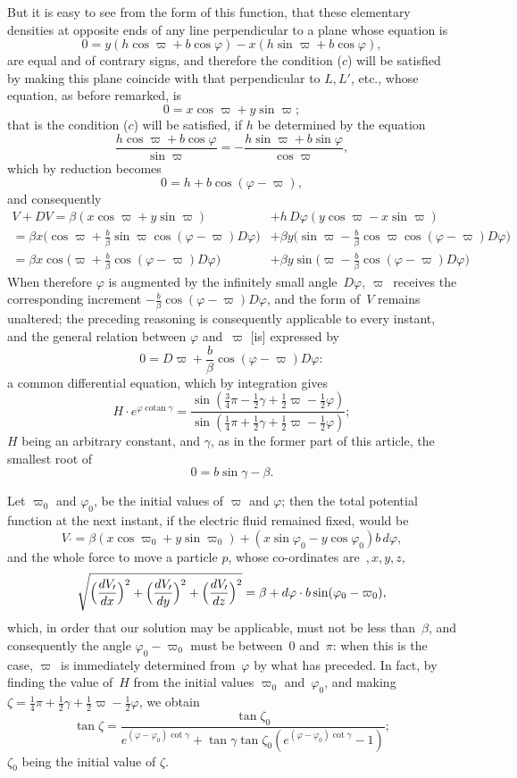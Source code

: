 \documentclass[11pt,notitlepage]{amsart}
\DeclareMathOperator{\cotan}{\textrm{cotan}}
\renewcommand{\phi}{\varphi}
\begin{document}
But it is easy to see from the form of this function, that these elementary
densities at opposite ends of any line
perpendicular to a plane whose equation is
\[
0 = y(h\cos\varpi+b\cos\phi)-x(h\sin\varpi+b\cos\phi),
\]
are equal and of contrary signs, and therefore the condition ($c$) will be 
satisfied by making this plane coincide with that perpendicular
to $L,L'$, etc.,
whose equation, as before remarked, is
\[
0=x\cos\varpi+y\sin\varpi;
\]
that is the condition ($c$) will be satisfied,
if $h$ be determined by the equation
\[
\frac{h\cos\varpi+b\cos\phi}{\sin\varpi}
=-\frac{h\sin\varpi+b\sin\phi}{\cos\varpi},
\]
which by reduction becomes
\[
0=h+b\cos(\phi-\varpi),
\]
and consequently
\[
\begin{aligned}
V+DV=\beta(x\cos\varpi+y\sin\varpi) &+ h\,D\phi(y\cos\varpi-x\sin\varpi)\\
=\beta x\bigl(\cos\varpi+\frac b\beta\sin\varpi\cos(\phi-\varpi)D\phi\bigr)
&+\beta y\bigl(\sin\varpi-\frac b\beta\cos\varpi\cos(\phi-\varpi)D\phi\bigr)\\
=\beta x\cos\bigl(\varpi+\frac b\beta\cos(\phi-\varpi)D\phi\bigr)
&+\beta y\sin\bigl(\varpi-\frac b\beta\cos(\phi-\varpi)D\phi\bigr)
\end{aligned}
\]
When therefore $\phi$ is augmented
by the infinitely small angle~$D\phi$, $\varpi$~receives
the corresponding increment $-\frac b\beta\cos(\phi-\varpi)D\phi$,
and the form of~$V$ remains
unaltered; the preceding reasoning is consequently applicable to every instant,
and the general relation between $\phi$ and~$\varpi$ [is] expressed by
\[
0=D\varpi+\frac b\beta\cos(\phi-\varpi)D\phi:
\]
a common differential equation, which by integration gives
\[
H\cdot e^{\phi\cotan\gamma}=
\frac{\sin(\frac34\pi-\frac12\gamma+\frac12\varpi-\frac12\phi)}
{\sin(\frac14\pi+\frac12\gamma+\frac12\varpi-\frac12\phi)};
\]
$H$ being an arbitrary constant, and $\gamma$,
as in the former part of this article,
the smallest root of
\[
0=b\sin\gamma-\beta.
\]

Let $\varpi_0$ and $\phi_0$, be the initial values of $\varpi$ and $\phi$;
then the total potential function at the next instant,
if the electric fluid remained fixed, would be
\[
V_\prime=
\beta(x\cos\varpi_0+y\sin\varpi_0)+(x\sin\phi_0-y\cos\phi_0)b\,d\phi,
\]
and the whole force to move a particle $p$, whose co-ordinates are~$,x,y,z$,
\[
\sqrt{
  \Bigl(\frac{dV_\prime}{dx}\Bigr)^2
  +\Bigl(\frac{dV_\prime}{dy}\Bigr)^2
  +\Bigl(\frac{dV_\prime}{dz}\Bigr)^2
}=\beta+d\phi\cdot b\sin(\phi_0-\varpi_0),
\]
which, in order that our solution may be applicable, must not be less 
than~$\beta$,
and consequently the angle $\phi_0-\varpi_0$
must be between~$0$ and~$\pi$: when this is
the case, $\varpi$~is immediately determined from~$\phi$
by what has preceded. In
fact, by finding the value of~$H$ from the initial
values $\varpi_0$ and~$\phi_0$, and
making $\zeta=\frac14\pi+\frac12\gamma+\frac12\varpi-\frac12\phi$, we obtain
\[
\tan\zeta=
\frac{\tan\zeta_0}
{e^{(\phi-\phi_0)\cot\gamma}+\tan\gamma\tan\zeta_0
(e^{(\phi-\phi_0)\cot\gamma}-1)};
\]
$\zeta_0$ being the initial value of $\zeta$.
\end{document}
